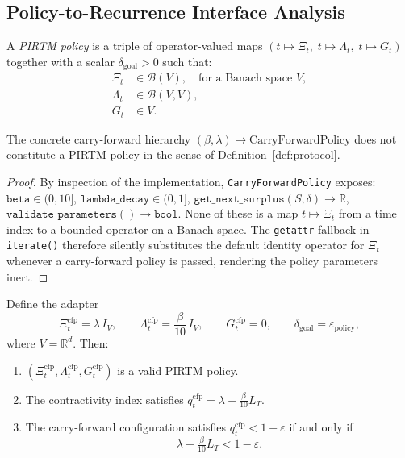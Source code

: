 \documentclass[11pt]{article}
\begin{document}
\subsection{Policy-to-Recurrence Interface Analysis}
\label{sec:policy}

\begin{definition}
\label{def:protocol}
A \emph{PIRTM policy} is a triple of operator-valued maps
$(t\mapsto\Xi_{t},\;t\mapsto\Lambda_{t},\;t\mapsto G_{t})$
together with a scalar $\delta_{\mathrm{goal}}>0$ such that:
\begin{align}
\Xi_{t}&\in\mathcal{B}(V), \quad\text{for a Banach space }V, \\
\Lambda_{t}&\in\mathcal{B}(V,V), \\
G_{t}&\in V.
\end{align}
\end{definition}

\begin{lemma}
\label{lem:disconnect}
The concrete carry-forward hierarchy
$(\beta,\lambda)\mapsto\mathrm{CarryForwardPolicy}$
does not constitute a PIRTM policy in the sense of
Definition~\ref{def:protocol}.
\end{lemma}

\begin{proof}
By inspection of the implementation,
\texttt{CarryForwardPolicy} exposes:
$\texttt{beta}\in(0,10]$,
$\texttt{lambda\_decay}\in(0,1]$,
$\texttt{get\_next\_surplus}(S,\delta)\to\mathbb{R}$,
$\texttt{validate\_parameters}()\to\texttt{bool}$.
None of these is a map $t\mapsto\Xi_{t}$
from a time index to a bounded operator on a Banach space.
The \texttt{getattr} fallback in \texttt{iterate()} therefore
silently substitutes the default identity operator for $\Xi_{t}$
whenever a carry-forward policy is passed,
rendering the policy parameters inert.
\end{proof}

\begin{proposition}
\label{prop:adapter}
Define the adapter
\[
\Xi_{t}^{\mathrm{cfp}} = \lambda\,I_{V},
\qquad
\Lambda_{t}^{\mathrm{cfp}} = \frac{\beta}{10}\,I_{V},
\qquad
G_{t}^{\mathrm{cfp}} = 0,
\qquad
\delta_{\mathrm{goal}} = \varepsilon_{\mathrm{policy}},
\]
where $V=\mathbb{R}^{d}$.
Then:
\begin{enumerate}[label=(\roman*)]
\item $(\Xi_{t}^{\mathrm{cfp}},\Lambda_{t}^{\mathrm{cfp}},G_{t}^{\mathrm{cfp}})$
      is a valid PIRTM policy.
\item The contractivity index satisfies
      $q_{t}^{\mathrm{cfp}} = \lambda + \tfrac{\beta}{10}L_{T}$.
\item The carry-forward configuration satisfies
      $q_{t}^{\mathrm{cfp}}<1-\varepsilon$ if and only if
      \[
      \lambda + \tfrac{\beta}{10}L_{T} < 1-\varepsilon.
      \]
\end{enumerate}
\end{proposition}
\end{document}
